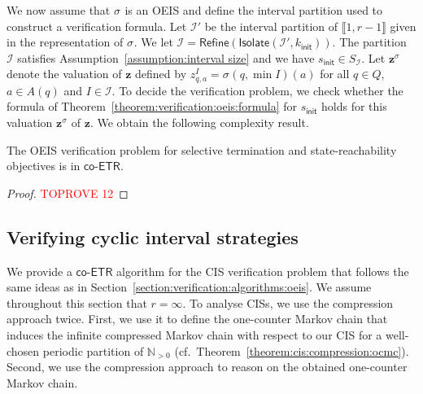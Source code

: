 \documentclass[a4paper,UKenglish,cleveref,autoref,thm-restate,colorlinks]{lipics-v2021}
\newcommand{\init}{\mathsf{init}}
\newcommand{\integerInterval}[1]{\llbracket{}#1\rrbracket{}}
\newcommand{\coetr}{\textsf{co-ETR}}
\newcommand{\IN}{\mathbb{N}}
\newcommand{\INpos}{\IN_{>0}}
\newcommand{\mdpStateSpace}{S}
\newcommand{\ocStateSpace}{Q}
\newcommand{\ocState}{q}
\newcommand{\ocCount}{k}
\newcommand{\ocConfig}{s}
\newcommand{\ocActionSpace}{A}
\newcommand{\ocAction}{a}
\newcommand{\counterUB}{r}
\newcommand{\intPart}{\mathcal{I}}
\newcommand{\interval}{I}
\newcommand{\compressChainStateSpace}{\mdpStateSpace_{\intPart}}
\newcommand{\varStrat}{z}
\newcommand{\varStratTuple}{\mathbf{\varStrat}}
\newcommand{\vectStratTuple}{\varStratTuple^\strat}
\newcommand{\stratGeneric}[1]{{\sigma_{#1}}}
\newcommand{\strat}{\stratGeneric{}}
\begin{document}
We now assume that $\strat$ is an OEIS and define the interval partition used to construct a verification formula.
Let $\intPart'$ be the interval partition of $\integerInterval{1, \counterUB-1}$ given in the representation of $\strat$.
We let $\intPart = \mathsf{Refine}(\mathsf{Isolate}(\intPart', \ocCount_\init))$.
The partition $\intPart$ satisfies Assumption~\ref{assumption:interval size} and we have $\ocConfig_\init\in\compressChainStateSpace$.
Let $\vectStratTuple$ denote the valuation of $\varStratTuple$ defined by $\varStrat^\interval_{\ocState, \ocAction}=\strat(\ocState, \min\interval)(\ocAction)$ for all $\ocState\in\ocStateSpace$, $\ocAction\in\ocActionSpace(\ocState)$ and $\interval\in\intPart$.
To decide the verification problem, we check whether the formula of Theorem~\ref{theorem:verification:oeis:formula} for $\ocConfig_\init$ holds for this valuation $\vectStratTuple$ of $\varStratTuple$.
We obtain the following complexity result.
\begin{theorem}\label{theorem:verification:oeis:complexity}
  The OEIS verification problem for selective termination and state-reachability objectives is in $\coetr$.
\end{theorem}
\begin{proof}\textcolor{red}{TOPROVE 12}\end{proof}

\subsection{Verifying cyclic interval strategies}\label{section:verification:algorithms:cis}

We provide a $\coetr$ algorithm for the CIS verification problem that follows the same ideas as in Section~\ref{section:verification:algorithms:oeis}.
We assume throughout this section that $\counterUB=\infty$.
To analyse CISs, we use the compression approach twice.
First, we use it to define the one-counter Markov chain that induces the infinite compressed Markov chain with respect to our CIS for a well-chosen periodic partition of $\INpos$ (cf.~Theorem~\ref{theorem:cis:compression:ocmc}).
Second, we use the compression approach to reason on the obtained one-counter Markov chain.
\end{document}
